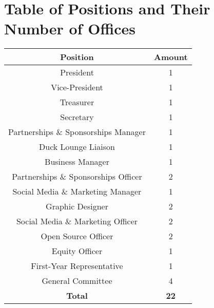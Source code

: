\documentclass{schedule}
\begin{document}
\section{Table of Positions and Their Number of Offices}\label{appendix:tablePositions}
\begin{center}
    \vspace{1em}
    \def\arraystretch{1.1}
    \begin{tabular}{c|c}
        \textbf{Position}                    & \textbf{Amount} \\
        \hline
        President                            & 1               \\
        Vice-President                       & 1               \\
        Treasurer                            & 1               \\
        Secretary                            & 1               \\
        Partnerships \& Sponsorships Manager & 1               \\
        Duck Lounge Liaison                  & 1               \\
        Business Manager                     & 1               \\
        Partnerships \& Sponsorships Officer & 2               \\
        Social Media \& Marketing Manager    & 1               \\
        Graphic Designer                     & 2               \\
        Social Media \& Marketing Officer    & 2               \\
        Open Source Officer                  & 2               \\
        Equity Officer                       & 1               \\
        First-Year Representative            & 1               \\
        General Committee                    & 4               \\
        \hline
        \textbf{Total}                       & \textbf{22}
    \end{tabular}
\end{center}

\newpage

\end{document}
